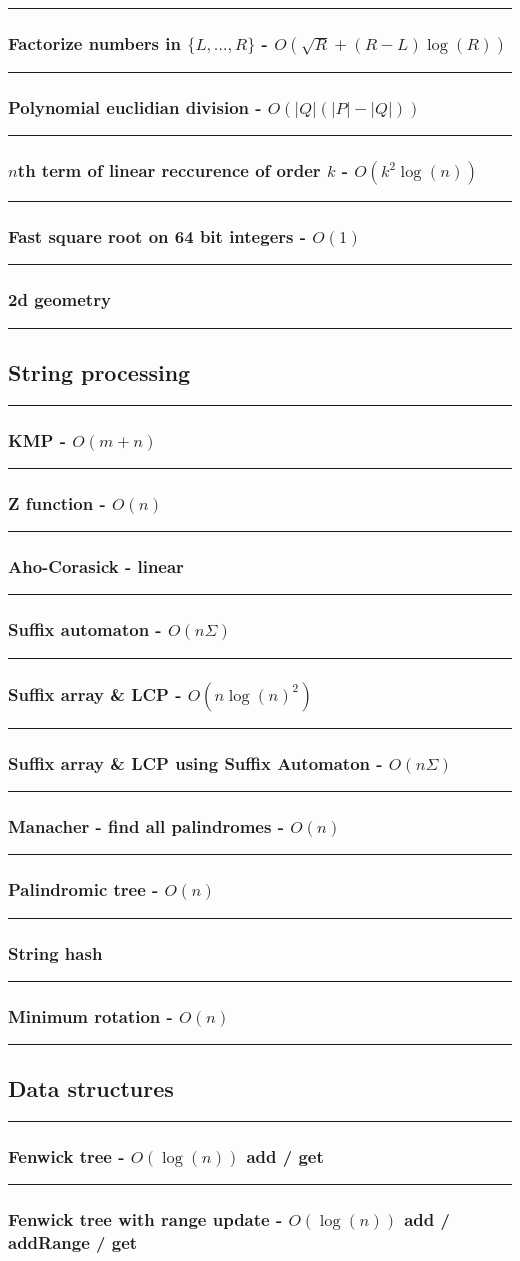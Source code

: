 \documentclass[landscape,a4paper,twocolumn,10pt]{report}
\renewcommand{\line}{\noindent\rule{\linewidth}{1pt}}
\newcommand{\algosection}[1]{\line \subsection*{#1}}
\newcommand{\algorithm}[1]{\line \subsubsection*{#1}}
\begin{document}
\algorithm{Factorize numbers in $\{L, \dots, R\}$ - $O(\sqrt{R} + (R-L) \log(R))$}


\algorithm{Polynomial euclidian division - $O(|Q|(|P|-|Q|))$}


\algorithm{$n$th term of linear reccurence of order $k$ - $O(k^2 \log(n))$}


\algorithm{Fast square root on 64 bit integers - $O(1)$}


\algorithm{2d geometry}


\algosection{String processing}
\label{string}

\algorithm{KMP - $O(m+n)$}


\algorithm{Z function - $O(n)$}


\algorithm{Aho-Corasick - linear}


\algorithm{Suffix automaton - $O(n \Sigma)$}


\algorithm{Suffix array \& LCP - $O(n \log(n)^2)$}


\algorithm{Suffix array \& LCP using Suffix Automaton - $O(n \Sigma)$}


\algorithm{Manacher - find all palindromes - $O(n)$}


\algorithm{Palindromic tree - $O(n)$}


\algorithm{String hash}


\algorithm{Minimum rotation - $O(n)$}


\algosection{Data structures}
\label{datastruct}

%

\algorithm{Fenwick tree - $O(\log(n))$ add / get}


\algorithm{Fenwick tree with range update - $O(\log(n))$ add / addRange / get}

\end{document}

